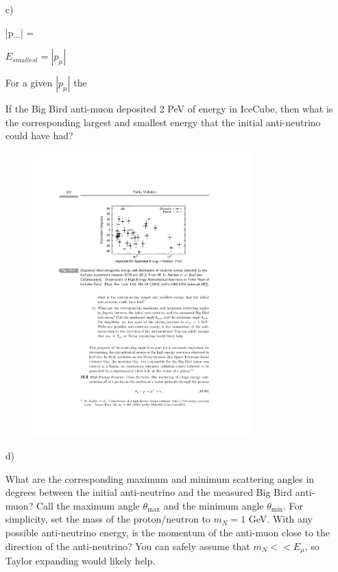 {\begin{itemize}
{\be
p_n = \left( E + m -  , 0, -, E -  \right)
\ee


}
\item[c)]{

\be
|p_\mu| = 
\be

$E_{smallest} = |p_\mu|$

For a given $|p_\mu|$ the


If the Big Bird anti-muon deposited 2 PeV of energy in IceCube, then what is the corresponding largest and smallest energy that the initial anti-neutrino could have had?

\begin{figure}[h!]
\centering
\includegraphics[width=0.8\textwidth]{./IcecubeData.pdf}
\caption{}
\end{figure}

}
\item[d)]{
What are the corresponding maximum and minimum scattering angles in degrees between the initial anti-neutrino and the measured Big Bird anti-muon? 
Call the maximum angle $\theta_{\mathrm{max}}$ and the minimum angle $\theta_{\mathrm{min}}$. 
For simplicity, set the mass of the proton/neutron to $m_N = 1$ GeV. 
With any possible anti-neutrino energy, is the momentum of the anti-muon close to the direction of the anti-neutrino? 
You can safely assume that $m_N << E_\mu$, so Taylor expanding would likely help.

}
\end{itemize}}
